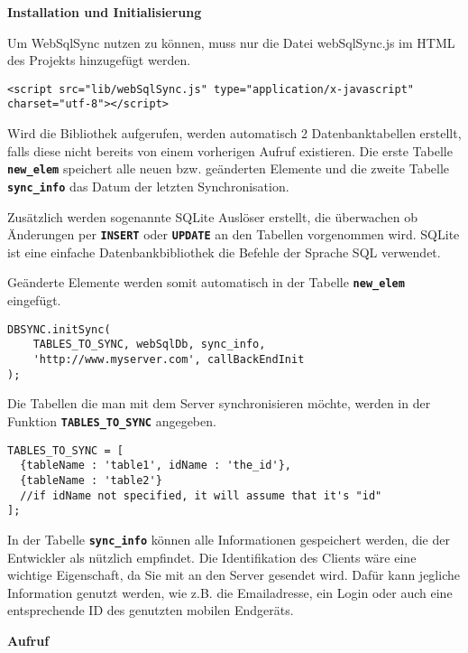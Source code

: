 \cleardoublepage

\textbf{Installation und Initialisierung}

Um WebSqlSync nutzen zu können, muss nur die Datei webSqlSync.js im \ac{HTML} des Projekts hinzugefügt werden.

\lstset{language=html}
\lstinline$<script src="lib/webSqlSync.js" type="application/x-javascript" charset="utf-8"></script>$

Wird die Bibliothek aufgerufen, werden automatisch 2 Datenbanktabellen erstellt, falls diese nicht bereits von einem vorherigen Aufruf existieren. Die erste Tabelle \textbf{\lstinline$new_elem$} speichert alle neuen bzw. geänderten Elemente und die zweite Tabelle \textbf{\lstinline$sync_info$} das Datum der letzten Synchronisation.

Zusätzlich werden sogenannte SQLite Auslöser erstellt, die überwachen ob Änderungen per \textbf{\lstinline$INSERT$} oder \textbf{\lstinline$UPDATE$} an den Tabellen vorgenommen wird. SQLite ist eine einfache Datenbankbibliothek die Befehle der Sprache \ac{SQL} verwendet.

Geänderte Elemente werden somit automatisch in der Tabelle \textbf{\lstinline$new_elem$} eingefügt.

\lstset{language=html}
\begin{lstlisting}
DBSYNC.initSync(
	TABLES_TO_SYNC, webSqlDb, sync_info,
	'http://www.myserver.com', callBackEndInit
);
\end{lstlisting}

Die Tabellen die man mit dem Server synchronisieren möchte, werden in der Funktion \textbf{\lstinline$TABLES_TO_SYNC$} angegeben.

\lstset{language=html}
\begin{lstlisting}
TABLES_TO_SYNC = [
  {tableName : 'table1', idName : 'the_id'},
  {tableName : 'table2'}
  //if idName not specified, it will assume that it's "id"
];
\end{lstlisting}

In der Tabelle \textbf{\lstinline$sync_info$} können alle Informationen gespeichert werden, die der Entwickler als nützlich empfindet. Die Identifikation des Clients wäre eine wichtige Eigenschaft, da Sie mit an den Server gesendet wird. Dafür kann jegliche Information genutzt werden, wie z.B. die Emailadresse, ein Login oder auch eine entsprechende \ac{ID} des genutzten mobilen Endgeräts.

\cleardoublepage

\textbf{Aufruf}


